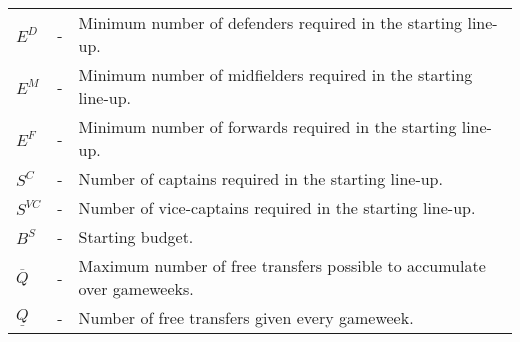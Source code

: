 \begin{table}[H]
\begin{tabular}{@{}lll@{}}
$E^{D}$                          & - & Minimum number of defenders required in the starting line-up.                                     \\
$E^{M}$                          & - & Minimum number of midfielders required in the starting line-up.                                   \\
$E^{F}$                          & - & Minimum number of forwards required in the starting line-up.                                      \\
$S^{C}$                          & - & Number of captains required in the starting line-up.                                              \\
$S^{VC}$                         & - & Number of vice-captains required in the starting line-up.                                         \\
$B^{S}$                          & - & Starting budget.                                                                               \\
$\overline{Q}$                   & - & Maximum number of free transfers possible to accumulate over gameweeks.                        \\
$\underline{Q}$                  & - & Number of free transfers given every gameweek.                                                 \\ \bottomrule
\end{tabular}
\end{table}


